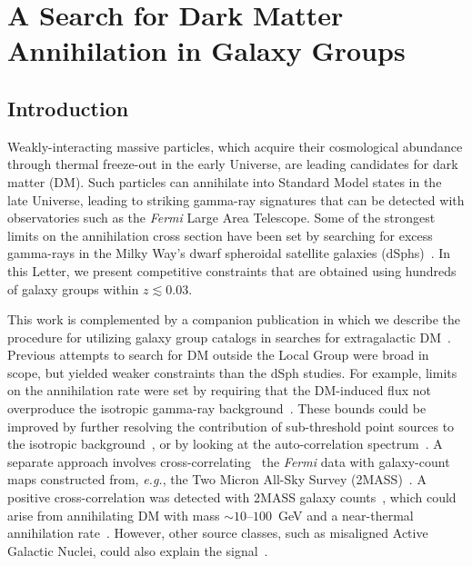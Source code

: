 \chapter{A Search for Dark Matter Annihilation in Galaxy Groups}
\label{ch:groups_data}

\section{Introduction}

Weakly-interacting massive particles, which acquire their cosmological abundance through thermal freeze-out in the early Universe, are leading candidates for dark matter (DM).  Such particles can annihilate into Standard Model states in the late Universe, leading to striking gamma-ray signatures that can be detected with observatories such as the {\it Fermi} Large Area Telescope.  
Some of the strongest limits on the annihilation cross section have been set by searching for excess gamma-rays in the Milky Way's dwarf spheroidal satellite galaxies (dSphs)~\cite{Ackermann:2015zua,Fermi-LAT:2016uux}.  In this Letter, we present competitive constraints that are obtained using hundreds of galaxy groups within $z\lesssim0.03$. 

This work is complemented by a companion publication in which we describe the procedure for utilizing  galaxy group catalogs in searches for extragalactic DM~\cite{companion}.  Previous attempts to search for DM outside the Local Group were broad in scope, but yielded weaker constraints than the dSph studies.  For example, limits on the annihilation rate were set by requiring that the DM-induced flux not overproduce the isotropic gamma-ray background~\cite{Ackermann:2015tah}.  These bounds could be improved by further resolving the contribution of sub-threshold point sources to the isotropic background~\cite{Zechlin:2016pme,Lisanti:2016jub}, or by  
looking at the auto-correlation spectrum~\cite{Ackermann:2012uf, Ackermann:2012uf,Ando:2006cr,Ando:2013ff}.  A separate approach involves cross-correlating~\cite{Xia:2011ax,Ando:2014aoa,Ando:2013xwa,Xia:2015wka,Regis:2015zka,Cuoco:2015rfa,Ando:2016ang} the {\it Fermi} data with galaxy-count maps constructed from, \emph{e.g.}, the Two Micron All-Sky Survey (2MASS)~\cite{Jarrett:2000me,Bilicki:2013sza}.  A positive cross-correlation was detected with 2MASS galaxy counts~\cite{Xia:2015wka}, which could arise from annihilating DM with mass $\sim$$10$--$100$~GeV and a near-thermal annihilation rate~\cite{Regis:2015zka}.  However, other source classes, such as misaligned Active Galactic Nuclei, could also explain the signal~\cite{Cuoco:2015rfa}.
  
